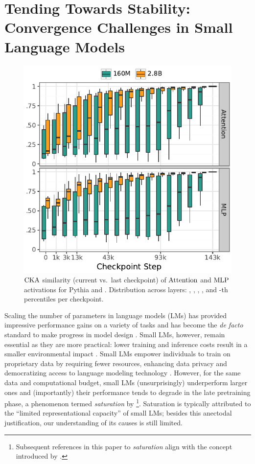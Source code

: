 \chapter{Tending Towards Stability: Convergence Challenges in Small Language Models}


\begin{figure}[!t]
    \centering
    \includegraphics[width=\columnwidth]{chapters/tending-towards-stability/figures/cka_main_plot.pdf}
    \caption{$\mathrm{CKA}$ similarity (current vs.\ last checkpoint) of $\mathrm{Attention}$ and $\mathrm{MLP}$ activations for Pythia \sixmil and \twobil. Distribution across layers: , , , , and -th percentiles per checkpoint.}
    \label{fig:cka_main_plot}
\end{figure}


Scaling the number of parameters in language models (LMs) has provided impressive performance gains on a variety of tasks \citep{hendrycks2021mmlu} and has become the \emph{de facto} standard to make progress in model design \citep[e.g.,][]{chowdhery2023palm}.
Small LMs, however, remain essential as they are more practical: lower training and inference costs result in a smaller environmental impact \citep{schwartz2020greenai}. 
Small LMs empower individuals to train on proprietary data by requiring fewer resources, enhancing data privacy \citep{huang2022large} and democratizing access to language modeling technology \citep{bender2021dangers}.
However, for the same data and computational budget, small LMs (unsurprisingly) underperform larger ones \citep{biderman2023pythia} and (importantly) their performance tends to degrade in the late pretraining phase, a phenomenon termed \textit{saturation} by \citet{godey2024small} \footnote{Subsequent references in this paper to \textit{saturation} align with the concept introduced by \citet{godey2024small}.}. Saturation is typically attributed to the \enquote{limited representational capacity} of small LMs; besides this anectodal justification, our understanding of its causes is still limited. 

